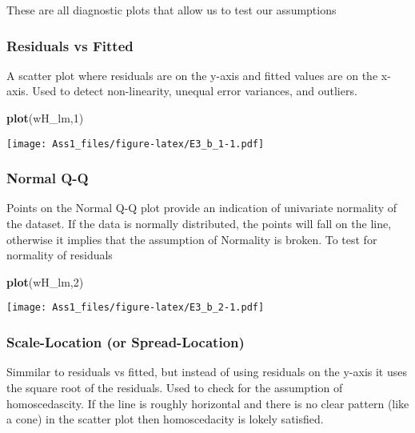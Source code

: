 \documentclass[
]{article}
\newenvironment{Shaded}{\begin{snugshade}}{\end{snugshade}}
\newcommand{\DecValTok}[1]{\textcolor[rgb]{0.00,0.00,0.81}{#1}}
\newcommand{\FunctionTok}[1]{\textcolor[rgb]{0.13,0.29,0.53}{\textbf{#1}}}
\newcommand{\NormalTok}[1]{#1}
\begin{document}
These are all diagnostic plots that allow us to test our assumptions

\subsubsection{Residuals vs Fitted}\label{residuals-vs-fitted}

A scatter plot where residuals are on the y-axis and fitted values are
on the x-axis. Used to detect non-linearity, unequal error variances,
and outliers.

\begin{Shaded}
\begin{Highlighting}[]
\FunctionTok{plot}\NormalTok{(wH\_lm,}\DecValTok{1}\NormalTok{)}
\end{Highlighting}
\end{Shaded}

\texttt{[image: Ass1\_files/figure-latex/E3\_b\_1-1.pdf]}

\subsubsection{Normal Q-Q}\label{normal-q-q}

Points on the Normal Q-Q plot provide an indication of univariate
normality of the dataset. If the data is normally distributed, the
points will fall on the line, otherwise it implies that the assumption
of Normality is broken. To test for normality of residuals

\begin{Shaded}
\begin{Highlighting}[]
\FunctionTok{plot}\NormalTok{(wH\_lm,}\DecValTok{2}\NormalTok{)}
\end{Highlighting}
\end{Shaded}

\texttt{[image: Ass1\_files/figure-latex/E3\_b\_2-1.pdf]}

\subsubsection{Scale-Location (or
Spread-Location)}\label{scale-location-or-spread-location}

Simmilar to residuals vs fitted, but instead of using residuals on the
y-axis it uses the square root of the residuals. Used to check for the
assumption of homoscedascity. If the line is roughly horizontal and
there is no clear pattern (like a cone) in the scatter plot then
homoscedacity is lokely satisfied.
\end{document}
